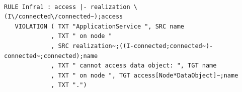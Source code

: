\documentclass[sn-vancouver]{sn-jnl}%
\begin{document}
{\tt\small
\begin{lstlisting}[frame=single, label={mc3}, caption={}]
   RULE Infra1 : access |- realization \ (I\/connected\/connected~);access
   VIOLATION ( TXT "ApplicationService ", SRC name
             , TXT " on node "
             , SRC realization~;((I-connected;connected~)-connected~;connected);name
             , TXT " cannot access data object: ", TGT name
             , TXT " on node ", TGT access[Node*DataObject]~;name
             , TXT ".")
\end{lstlisting}
}
\end{document}
